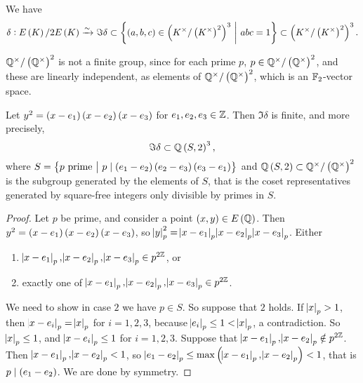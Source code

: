 \begin{remark}
We have
$$ \delta : E\br{K} / 2E\br{K} \xrightarrow{\sim} \Im \delta \subset \cbr{\br{a, b, c} \in \br{K^\times / \br{K^\times}^2}^3 \st abc = 1} \subset \br{K^\times / \br{K^\times}^2}^3. $$
\end{remark}

\begin{example*}
$ \QQ^\times / \br{\QQ^\times}^2 $ is not a finite group, since for each prime $ p $, $ p \in \QQ^\times / \br{\QQ^\times}^2 $, and these are linearly independent, as elements of $ \QQ^\times / \br{\QQ^\times}^2 $, which is an $ \mathbb{F}_2 $-vector space.
\end{example*}


\begin{proposition}
Let $ y^2 = \br{x - e_1}\br{x - e_2}\br{x - e_3} $ for $ e_1, e_2, e_3 \in \mathbb{Z} $. Then $ \Im \delta $ is finite, and more precisely,
$$ \Im \delta \subset \QQ\br{S, 2}^3, $$
where $ S = \cbr{p \ \text{prime} \st p \mid \br{e_1 - e_2}\br{e_2 - e_3}\br{e_3 - e_1}} $ and $ \QQ\br{S, 2} \subset \QQ^\times / \br{\QQ^\times}^2 $ is the subgroup generated by the elements of $ S $, that is the coset representatives generated by square-free integers only divisible by primes in $ S $.
\end{proposition}

\begin{proof}
Let $ p $ be prime, and consider a point $ \br{x, y} \in E\br{\QQ} $. Then $ y^2 = \br{x - e_1}\br{x - e_2}\br{x - e_3} $, so $ \abs{y}_p^2 = \abs{x - e_1}_p\abs{x - e_2}_p\abs{x - e_3}_p $. Either
\begin{enumerate}
\item $ \abs{x - e_1}_p, \abs{x - e_2}_p, \abs{x - e_3}_p \in p^{2\mathbb{Z}} $, or
\item exactly one of $ \abs{x - e_1}_p, \abs{x - e_2}_p, \abs{x - e_3}_p \in p^{2\mathbb{Z}} $.
\end{enumerate}
We need to show in case $ 2 $ we have $ p \in S $. So suppose that $ 2 $ holds. If $ \abs{x}_p > 1 $, then $ \abs{x - e_i}_p = \abs{x}_p $ for $ i = 1, 2, 3 $, because $ \abs{e_i}_p \le 1 < \abs{x}_p $, a contradiction. So $ \abs{x}_p \le 1 $, and $ \abs{x - e_i}_p \le 1 $ for $ i = 1, 2, 3 $. Suppose that $ \abs{x - e_1}_p, \abs{x - e_2}_p \notin p^{2\mathbb{Z}} $. Then $ \abs{x - e_1}_p, \abs{x - e_2}_p < 1 $, so $ \abs{e_1 - e_2}_p \le \max\br{\abs{x - e_1}_p, \abs{x - e_2}_p} < 1 $, that is $ p \mid \br{e_1 - e_2} $. We are done by symmetry.
\end{proof}

